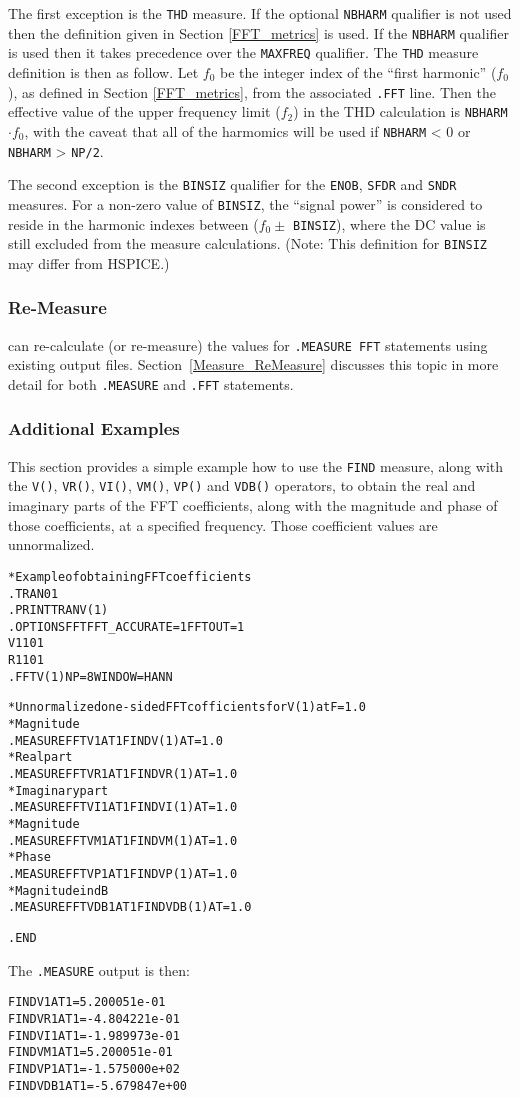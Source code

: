 The first exception is the \texttt{THD} measure.  If the optional \texttt{NBHARM}
qualifier is not used then the definition given in Section \ref{FFT_metrics} is
used.  If the \texttt{NBHARM} qualifier is used then it takes precedence over the
\texttt{MAXFREQ} qualifier.  The \texttt{THD} measure definition is then as follow.
Let $f_{0}$ be the integer index of the ``first harmonic'' ($f_{0}$), as defined in
Section \ref{FFT_metrics}, from the associated \texttt{.FFT} line.  Then the
effective value of the upper frequency limit ($f_{2}$) in the THD calculation
is \texttt{NBHARM}$\cdot f_{0}$, with the caveat that all of the harmomics will
be used if \texttt{NBHARM} < 0 or \texttt{NBHARM} > \texttt{NP/2}.

The second exception is the \texttt{BINSIZ} qualifier for the \texttt{ENOB},
\texttt{SFDR} and \texttt{SNDR} measures.  For a non-zero value of
\texttt{BINSIZ}, the ``signal power'' is considered to reside in the harmonic
indexes between ($f_{0} \pm$ \texttt{BINSIZ}), where the DC value is still
excluded from the measure calculations. (Note: This definition for 
\texttt{BINSIZ} may differ from HSPICE.)

\subsubsection{Re-Measure}
\label{Measure_FFT_ReMeasure}
\Xyce{} can re-calculate (or re-measure) the values for {\tt .MEASURE FFT}
statements using existing \Xyce{} output files.  Section~\ref{Measure_ReMeasure}
discusses this topic in more detail for both {\tt .MEASURE} and {\tt .FFT}
statements.

\subsubsection{Additional Examples}
\label{Measure_FFT_Additional_Examples}
This section provides a simple example how to use the {\tt FIND} measure,
along with the {\tt V()}, {\tt VR()}, {\tt VI()}, {\tt VM()}, {\tt VP()}
and {\tt VDB()} operators, to obtain the real and imaginary parts of the
FFT coefficients, along with the magnitude and phase of those coefficients,
at a specified frequency.  Those coefficient values are unnormalized.

\begin{alltt}
* Example of obtaining FFT coefficients
.TRAN 0 1
.PRINT TRAN V(1)
.OPTIONS FFT FFT_ACCURATE=1 FFTOUT=1
V1 1 0 1
R1 1 0 1
.FFT V(1) NP=8 WINDOW=HANN

* Unnormalized one-sided FFT cofficients for V(1) at F=1.0
* Magnitude
.MEASURE FFT V1AT1 FIND V(1) AT=1.0
* Real part
.MEASURE FFT VR1AT1 FIND VR(1) AT=1.0
* Imaginary part
.MEASURE FFT VI1AT1 FIND VI(1) AT=1.0
* Magnitude
.MEASURE FFT VM1AT1 FIND VM(1) AT=1.0
* Phase
.MEASURE FFT VP1AT1 FIND VP(1) AT=1.0
* Magnitude in dB
.MEASURE FFT VDB1AT1 FIND VDB(1) AT=1.0

.END
\end{alltt}

The {\tt .MEASURE} output is then:
\begin{alltt}
FINDV1AT1 = 5.200051e-01
FINDVR1AT1 = -4.804221e-01
FINDVI1AT1 = -1.989973e-01
FINDVM1AT1 = 5.200051e-01
FINDVP1AT1 = -1.575000e+02
FINDVDB1AT1 = -5.679847e+00
\end{alltt}


